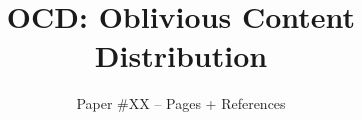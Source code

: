 \documentclass[9pt,twocolumn]{confpaper}
\begin{document}
\date{}
\title{\Huge\bf OCD: Oblivious Content Distribution}
\author{
{\Large Paper \#XX -- \pageref{lastpage} Pages + References} \\
}

\maketitle

\begin{abstract}
\end{abstract}










\label{lastpage} 


\balance 
\end{document}
